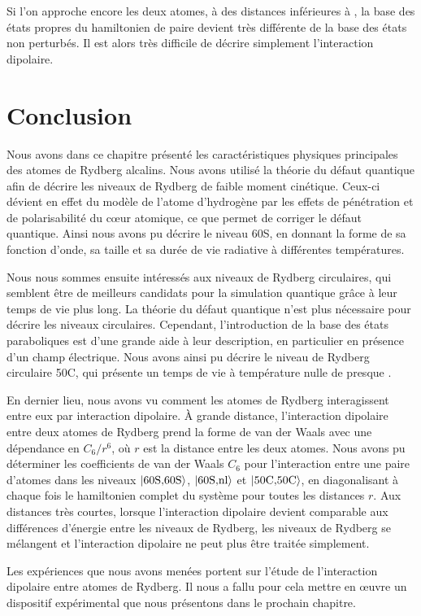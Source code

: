 Si l'on approche encore les deux atomes, à des distances inférieures à , la base des états propres du hamiltonien de paire devient très différente de la base des états non perturbés.
Il est alors très difficile de décrire simplement l'interaction dipolaire.

\section*{Conclusion}
\noindent Nous avons dans ce chapitre présenté les caractéristiques physiques principales des atomes de Rydberg alcalins.
Nous avons utilisé la théorie du défaut quantique afin de décrire les niveaux de Rydberg de faible moment cinétique.
Ceux-ci dévient en effet du modèle de l'atome d'hydrogène par les effets de pénétration et de polarisabilité du c\oe ur atomique, ce que permet de corriger le défaut quantique.
Ainsi nous avons pu décrire le niveau 60S, en donnant la forme de sa fonction d'onde, sa taille et sa durée de vie radiative à différentes températures.

Nous nous sommes ensuite intéressés aux niveaux de Rydberg circulaires, qui semblent être de meilleurs candidats pour la simulation quantique grâce à leur temps de vie plus long.
La théorie du défaut quantique n'est plus nécessaire pour décrire les niveaux circulaires.
Cependant, l'introduction de la base des états paraboliques est d'une grande aide à leur description, en particulier en présence d'un champ électrique.
Nous avons ainsi pu décrire le niveau de Rydberg circulaire 50C, qui présente un temps de vie à température nulle de presque .

En dernier lieu, nous avons vu comment les atomes de Rydberg interagissent entre eux par interaction dipolaire.
\`A grande distance, l'interaction dipolaire entre deux atomes de Rydberg prend la forme de van der Waals avec une dépendance en $C_6/r^6$, où $r$ est la distance entre les deux atomes.
Nous avons pu déterminer les coefficients de van der Waals $C_6$ pour l'interaction entre une paire d'atomes dans les niveaux $\ket{\text{60S,60S}}$, $\ket{\text{60S,nl}}$ et $\ket{\text{50C,50C}}$, en diagonalisant à chaque fois le hamiltonien complet du système pour toutes les distances $r$.
Aux distances très courtes, lorsque l'interaction dipolaire devient comparable aux différences d'énergie entre les niveaux de Rydberg, les niveaux de Rydberg se mélangent et l'interaction dipolaire ne peut plus être traitée simplement.

Les expériences que nous avons menées portent sur l'étude de l'interaction dipolaire entre atomes de Rydberg.
Il nous a fallu pour cela mettre en \oe uvre un dispositif expérimental que nous présentons dans le prochain chapitre.%


